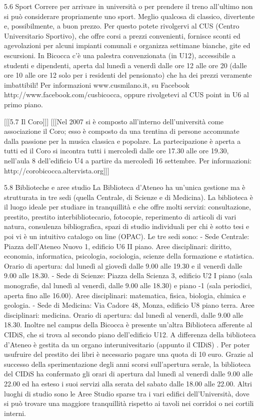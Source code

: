 5.6 Sport
Correre per arrivare in università o per prendere il treno all'ultimo non si può considerare propriamente uno sport. Meglio qualcosa di classico, divertente e, possibilmente, a buon prezzo.
Per questo potete rivolgervi al CUS (Centro Universitario Sportivo), che offre corsi a prezzi convenienti, fornisce sconti ed agevolazioni per alcuni impianti comunali e organizza settimane bianche, gite ed escursioni. In Bicocca c'è una palestra convenzionata (in U12), accessibile a studenti e dipendenti, aperta dal lunedì a venerdì dalle ore 12 alle ore 20 (dalle ore 10 alle ore 12 solo per i residenti del pensionato) che ha dei prezzi veramente imbattibili! Per informazioni www.cusmilano.it, su Facebook http://www.facebook.com/cusbicocca, oppure rivolgetevi al CUS point in U6 al primo piano.

[[[5.7 Il Coro]]]
[[[Nel 2007 si è composto all'interno dell'università come associazione il Coro; esso è composto da una trentina di persone accomunate dalla passione per la musica classica e popolare. La partecipazione è aperta a tutti ed il Coro si incontra tutti i mercoledì dalle ore 17.30 alle ore 19.30, nell'aula 8 dell'edificio U4 a partire da mercoledì 16 settembre. Per informazioni: http://corobicocca.altervista.org]]]

5.8 Biblioteche e aree studio
La Biblioteca d'Ateneo ha un'unica gestione ma è strutturata in tre sedi (quella Centrale, di Scienze e di Medicina). La biblioteca è il luogo ideale per studiare in tranquillità e che offre molti servizi: consultazione, prestito, prestito interbibliotecario, fotocopie, reperimento di articoli di vari natura, consulenza bibliografica, spazi di studio individuali per chi è sotto tesi e poi vi è un intuitivo catalogo on line (OPAC).
Le tre sedi sono:
- Sede Centrale: Piazza dell'Ateneo Nuovo 1, edificio U6 II piano. Aree disciplinari: diritto, economia, informatica, psicologia, sociologia, scienze della formazione e statistica. Orario di apertura: dal lunedì al giovedì dalle 9.00 alle 19.30 e il venerdì dalle 9.00 alle 18.30.
- Sede di Scienze: Piazza della Scienza 3, edificio U2 I piano (sala monografie, dal lunedì al venerdì, dalle 9.00 alle 18.30) e piano -1 (sala periodici, aperta fino alle 16.00). Aree disciplinari: matematica, fisica, biologia, chimica e geologia.
- Sede di Medicina: Via Cadore 48, Monza, edificio U8 piano terra. Aree disciplinari: medicina. Orario di apertura: dal lunedì al venerdì, dalle 9.00 alle 18.30.
Inoltre nel campus della Bicocca è presente un'altra Biblioteca afferente al CIDiS, che si trova al secondo piano dell'edificio U12. A differenza della biblioteca d'Ateneo è gestita da un organo interunivesitario (appunto il CIDiS) . Per poter usufruire del prestito dei libri è necessario pagare una quota di 10 euro. Grazie al successo della sperimentazione degli anni scorsi sull'apertura serale, la biblioteca del CIDiS ha confermato gli orari di apertura dal lunedì al venerdì dalle 9.00 alle 22.00 ed ha esteso i suoi servizi alla serata del sabato dalle 18.00 alle 22.00.
Altri luoghi di studio sono le Aree Studio sparse tra i vari edifici dell'Università, dove si può trovare una maggiore tranquillità rispetto ai tavoli nei corridoi o nei cortili interni.

